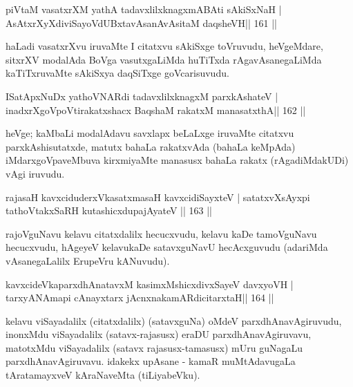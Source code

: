 \begin{shl}
piVtaM vasatxrXM yathA tadavxlilxknagxmABAti sAkiSxNaH |
AsAtxrXyXdiviSayoVdUBxtavAsanAvAsitaM daqsheVH\hfill || 161 ||
\end{shl}

\begin{artha}
haLadi vasatxrXvu iruvaMte I citatxvu sAkiSxge toVruvudu, heVgeMdare,
sitxrXV modalAda BoVga vasutxgaLiMda huTiTxda rAgavAsanegaLiMda
kaTiTxruvaMte sAkiSxya daqSiTxge goVcarisuvudu.
\end{artha}


\begin{shl}
ISatApxNuDx yathoVNARdi tadavxlilxknagxM parxkAshateV |
inadxrXgoVpoV\s tirakatxshacx BaqshaM rakatxM manasatxthA\hfill || 162 ||
\end{shl}

\begin{artha}
heVge; kaMbaLi modalAdavu savxlapx beLaLxge iruvaMte citatxvu parxkAshisutatxde, matutx bahaLa rakatxvAda (bahaLa keMpAda) iMdarxgoVpaveMbuva kirxmiyaMte manasusx bahaLa rakatx (rAgadiMdakUDi) vAgi iruvudu.
\end{artha}


\begin{shl}
rajasaH kavxciduderxVkasatxmasaH kavxcidiSayxteV |
satatxvXsAyxpi tathoVtakxSaRH kutashicxdupajAyateV ||  163 ||
\end{shl}

\begin{artha}
rajoVguNavu kelavu citatxdalilx hecucxvudu, kelavu kaDe tamoVguNavu hecucxvudu, hAgeyeV kelavukaDe satavxguNavU hecAcxguvudu (adariMda vAsanegaLalilx ErupeVru kANuvudu).
\end{artha}

\begin{shl}
kavxcideVkaparxdhAnatavxM kasimxMshicxdivxSayeV davxyoVH |
tarxyANAmapi cAnayxtarx jAcnxnakamARdicitarxtaH\hfill || 164 ||
\end{shl}

\begin{artha}
kelavu viSayadalilx (citatxdalilx) (satavxguNa) oMdeV parxdhAnavAgiruvudu, inonxMdu viSayadalilx (satavx-rajasusx) eraDU parxdhAnavAgiruvavu, matotxMdu viSayadalilx (satavx rajasusx-tamasusx) mUru guNagaLu parxdhAnavAgiruvavu. idakekx upAsane - kamaR muMtAdavugaLa tAratamayxveV kAraNaveMta (tiLiyabeVku).
\end{artha}

